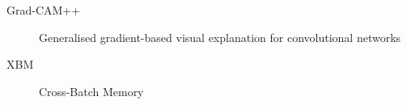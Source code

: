 \begin{description}
    \item[Grad-CAM++] Generalised gradient-based visual explanation for convolutional networks
    \item[XBM] Cross-Batch Memory
\end{description}
